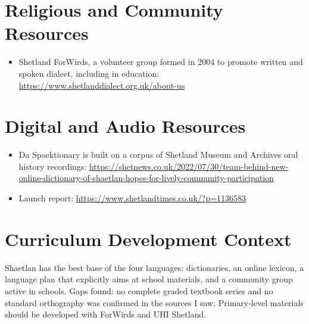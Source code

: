 \documentclass[12pt]{article}
\begin{document}
\section{Religious and Community Resources}
\begin{itemize}
\item Shetland ForWirds, a volunteer group formed in 2004 to promote written and spoken dialect, including in education: \url{https://www.shetlanddialect.org.uk/about-us}
\end{itemize}

\section{Digital and Audio Resources}
\begin{itemize}
\item Da Spaektionary is built on a corpus of Shetland Museum and Archives oral history recordings: \url{https://shetnews.co.uk/2022/07/30/team-behind-new-online-dictionary-of-shaetlan-hopes-for-lively-community-participation}
\item Launch report: \url{https://www.shetlandtimes.co.uk/?p=1136583}
\end{itemize}

\section{Curriculum Development Context}
Shaetlan has the best base of the four languages: dictionaries, an online lexicon, a language plan that explicitly aims at school materials, and a community group active in schools. Gaps found: no complete graded textbook series and no standard orthography was confirmed in the sources I saw. Primary-level materials should be developed with ForWirds and UHI Shetland.
\end{document}
